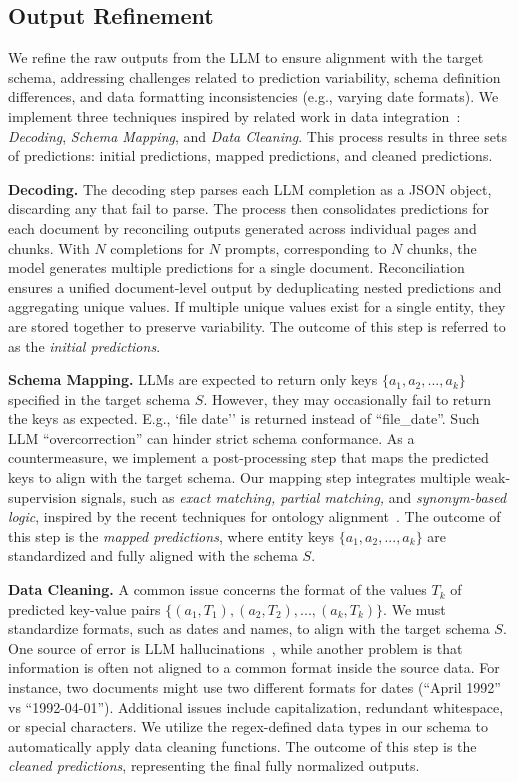 \subsection{Output Refinement}
\label{subsec:post_processing}
We refine the raw outputs from the LLM to ensure alignment with the target schema, addressing challenges related to prediction variability, schema definition differences, and data formatting inconsistencies (e.g., varying date formats). We implement three techniques inspired by related work in data integration~\cite{dong2013big}: \textit{Decoding}, \textit{Schema Mapping}, and \textit{Data Cleaning}. This process results in three sets of predictions: initial predictions, mapped predictions, and cleaned predictions.

\noindent \textbf{Decoding.} The decoding step parses each LLM completion as a JSON object, discarding any that fail to parse. The process then consolidates predictions for each document by reconciling outputs generated across individual pages and chunks. With $N$ completions for $N$ prompts, corresponding to $N$ chunks, the model generates multiple predictions for a single document. Reconciliation ensures a unified document-level output by deduplicating nested predictions and aggregating unique values. If multiple unique values exist for a single entity, they are stored together to preserve variability. The outcome of this step is referred to as the \emph{initial predictions}.

\noindent \textbf{Schema Mapping.} LLMs are expected to return only keys $\{a_1, a_2, ..., a_k\}$ specified in the target schema $S$. 
However, they may occasionally fail to return the keys as expected. E.g., `file date'' is returned instead of ``file\_date''. Such LLM ``overcorrection'' can hinder strict schema conformance.
As a countermeasure, we implement a post-processing step that maps the predicted keys to align with the target schema.
Our mapping step integrates multiple weak-supervision signals, such as \textit{exact matching, partial matching,} and \textit{synonym-based logic}, inspired by the recent techniques for ontology alignment~\cite{furst2023versamatch}.
The outcome of this step is the \emph{mapped predictions}, where entity keys $\{a_1, a_2, ..., a_k\}$ are standardized and fully aligned with the schema $S$.

\noindent \textbf{Data Cleaning.} A common issue concerns the format of the values $T_k$ of predicted key-value pairs $\{(a_1, T_1), (a_2, T_2), ..., (a_k, T_k)\}$. We must standardize formats, such as dates and names, to align with the target schema $S$.
One source of error is LLM hallucinations~\cite{ji2023survey, huang2023survey, xu2024hallucination}, while another problem is that information is often not aligned to a common format inside the source data. For instance, two documents might use two different formats for dates (``April 1992'' vs ``1992-04-01''). Additional issues include capitalization, redundant whitespace, or special characters. We utilize the regex-defined data types in our schema to automatically apply data cleaning functions. 
The outcome of this step is the \emph{cleaned predictions}, representing the final fully normalized outputs.

